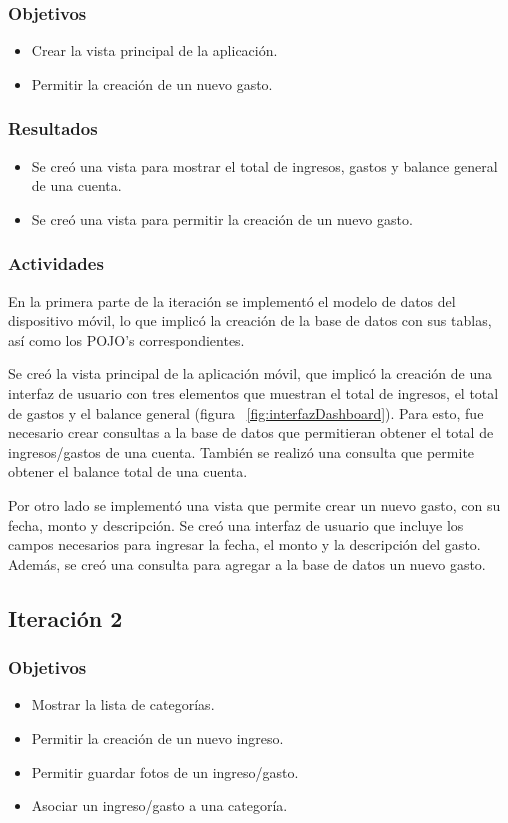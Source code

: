 \subsubsection{Objetivos}
	\begin{itemize}
	\item Crear la vista principal de la aplicación.
	\item Permitir la creación de un nuevo gasto.
	\end{itemize}

\subsubsection{Resultados}
\begin{itemize}
\item Se creó una vista para mostrar el total de ingresos, gastos y balance general de una cuenta.
\item Se creó una vista para permitir la creación de un nuevo gasto.
\end{itemize}

\subsubsection{Actividades}
En la primera parte de la iteración se implementó el modelo de datos del dispositivo móvil, lo que implicó la creación de la base de datos con sus tablas, así como los POJO's correspondientes.

Se creó la vista principal de la aplicación móvil, que implicó la creación de una interfaz de usuario con tres elementos que muestran el total de ingresos, el total de gastos y el balance general (figura ~\ref{fig:interfazDashboard}). Para esto, fue necesario crear consultas a la base de datos que permitieran obtener el total de ingresos/gastos de una cuenta.  También se realizó una consulta que permite obtener el balance total de una cuenta.

Por otro lado se implementó una vista que permite crear un nuevo gasto, con su fecha, monto y descripción. Se creó una interfaz de usuario que incluye los campos necesarios para ingresar la fecha, el monto y la descripción del gasto. Además, se creó una consulta para agregar a la base de datos un nuevo gasto.

\subsection{Iteración 2}

\subsubsection{Objetivos}
\begin{itemize}
\item Mostrar la lista de categorías.
\item Permitir la creación de un nuevo ingreso.
\item Permitir guardar fotos de un ingreso/gasto.
\item Asociar un ingreso/gasto a una categoría.
\end{itemize}

